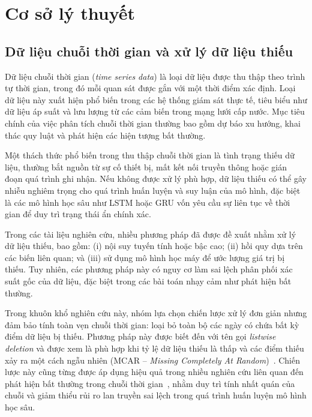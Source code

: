 \chapter{Cơ sở lý thuyết}
\section{Dữ liệu chuỗi thời gian và xử lý dữ liệu thiếu}

Dữ liệu chuỗi thời gian (\textit{time series data}) là loại dữ liệu được thu thập theo trình tự thời gian, trong đó mỗi quan sát được gắn với một thời điểm xác định. Loại dữ liệu này xuất hiện phổ biến trong các hệ thống giám sát thực tế, tiêu biểu như dữ liệu áp suất và lưu lượng từ các cảm biến trong mạng lưới cấp nước. Mục tiêu chính của việc phân tích chuỗi thời gian thường bao gồm dự báo xu hướng, khai thác quy luật và phát hiện các hiện tượng bất thường.

Một thách thức phổ biến trong thu thập chuỗi thời gian là tình trạng thiếu dữ liệu, thường bắt nguồn từ sự cố thiết bị, mất kết nối truyền thông hoặc gián đoạn quá trình ghi nhận. Nếu không được xử lý phù hợp, dữ liệu thiếu có thể gây nhiễu nghiêm trọng cho quá trình huấn luyện và suy luận của mô hình, đặc biệt là các mô hình học sâu như LSTM hoặc GRU vốn yêu cầu sự liên tục về thời gian để duy trì trạng thái ẩn chính xác.

Trong các tài liệu nghiên cứu, nhiều phương pháp đã được đề xuất nhằm xử lý dữ liệu thiếu, bao gồm: (i) nội suy tuyến tính hoặc bậc cao; (ii) hồi quy dựa trên các biến liên quan; và (iii) sử dụng mô hình học máy để ước lượng giá trị bị thiếu. Tuy nhiên, các phương pháp này có nguy cơ làm sai lệch phân phối xác suất gốc của dữ liệu, đặc biệt trong các bài toán nhạy cảm như phát hiện bất thường.

Trong khuôn khổ nghiên cứu này, nhóm lựa chọn chiến lược xử lý đơn giản nhưng đảm bảo tính toàn vẹn chuỗi thời gian: loại bỏ toàn bộ các ngày có chứa bất kỳ điểm dữ liệu bị thiếu. Phương pháp này được biết đến với tên gọi \textit{listwise deletion} và được xem là phù hợp khi tỷ lệ dữ liệu thiếu là thấp và các điểm thiếu xảy ra một cách ngẫu nhiên (MCAR -- \textit{Missing Completely At Random})~\cite{schafer2002missing}. Chiến lược này cũng từng được áp dụng hiệu quả trong nhiều nghiên cứu liên quan đến phát hiện bất thường trong chuỗi thời gian~\cite{malhotra2016lstm, hundman2018detecting}, nhằm duy trì tính nhất quán của chuỗi và giảm thiểu rủi ro lan truyền sai lệch trong quá trình huấn luyện mô hình học sâu.
